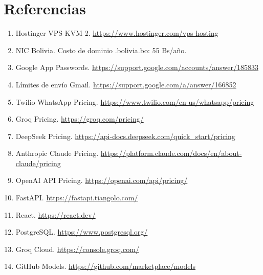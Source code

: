 \chapter*{Referencias}

\begin{enumerate}[nosep]
    \item Hostinger VPS KVM 2. \url{https://www.hostinger.com/vps-hosting}
    \item NIC Bolivia. Costo de dominio .bolivia.bo: 55 Bs/a\~no.
    \item Google App Passwords. \url{https://support.google.com/accounts/answer/185833}
    \item L\'imites de env\'io Gmail. \url{https://support.google.com/a/answer/166852}
    \item Twilio WhatsApp Pricing. \url{https://www.twilio.com/en-us/whatsapp/pricing}
    \item Groq Pricing. \url{https://groq.com/pricing/}
    \item DeepSeek Pricing. \url{https://api-docs.deepseek.com/quick_start/pricing}
    \item Anthropic Claude Pricing. \url{https://platform.claude.com/docs/en/about-claude/pricing}
    \item OpenAI API Pricing. \url{https://openai.com/api/pricing/}
    \item FastAPI. \url{https://fastapi.tiangolo.com/}
    \item React. \url{https://react.dev/}
    \item PostgreSQL. \url{https://www.postgresql.org/}
    \item Groq Cloud. \url{https://console.groq.com/}
    \item GitHub Models. \url{https://github.com/marketplace/models}
\end{enumerate}
